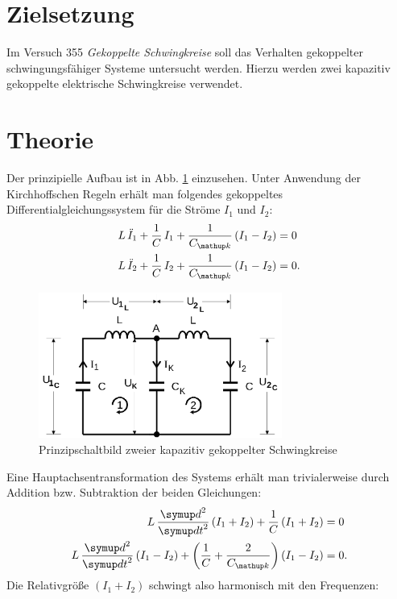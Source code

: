 \setcounter{page}{1}
\section*{Zielsetzung}
Im Versuch 355 \emph{Gekoppelte Schwingkreise} soll das Verhalten gekoppelter schwingungsfähiger Systeme untersucht werden. Hierzu
werden zwei kapazitiv gekoppelte elektrische Schwingkreise verwendet.
\section{Theorie}
Der prinzipielle Aufbau ist in Abb. \ref{fig: prinz_schwingkreis} einzusehen. Unter Anwendung der Kirchhoffschen Regeln erhält man folgendes gekoppeltes
Differentialgleichungssystem für die Ströme $I_1$ und $I_2$:
\begin{align}
\begin{aligned}
L \, \ddot{I}_1 + \frac{1}{C} \, I_1 + \frac{1}{C\ua{k}} \left(I_1 - I_2 \right) &= 0 \\
L \, \ddot{I}_2 + \frac{1}{C} \, I_2 + \frac{1}{C\ua{k}} \left(I_1 - I_2 \right) &= 0.
\end{aligned}
\end{align}

\begin{figure}
  \centering
  \includegraphics[width = 8cm]{pics/prinzip_schwingkreis.png}
  \caption{Prinzipschaltbild zweier kapazitiv gekoppelter Schwingkreise \cite{anleitung355}}
  \label{fig: prinz_schwingkreis}
\end{figure}

Eine Hauptachsentransformation des Systems erhält man trivialerweise durch Addition bzw. %
Subtraktion der beiden Gleichungen:
\begin{align}
\begin{aligned}
  L\,\frac{\dif{}^2}{\dif{t}^2} \left( I_1 + I_2 \right) + \frac{1}{C} \left( I_1 + I_2 \right) &= 0 \\
  L\,\frac{\dif{}^2}{\dif{t}^2} \left( I_1 - I_2 \right) + \left(\frac{1}{C} + \frac{2}{C\ua{k}}\right) \left( I_1 - I_2 \right) &= 0.
  \label{eq: gekoppeltes_lgs}
\end{aligned}
\end{align}
Die Relativgröße $\left( I_1 + I_2 \right)$ schwingt also harmonisch mit den Frequenzen:

